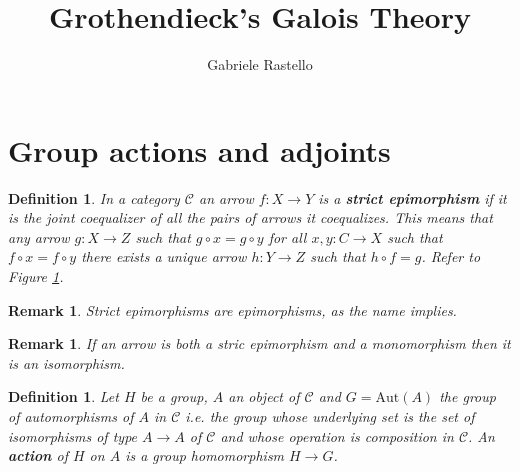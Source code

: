 \documentclass[italian, 12pt, reqno]{article}
\theoremstyle{myteo}
\newtheorem{definition}[theorem]{Definition}
\newtheorem{remark}[theorem]{Remark}
\numberwithin{equation}{section}
\newcommand{\cat}[1]{\mathscr{#1}}
\newcommand{\aut}{\text{Aut}}
\newcommand{\fun}[3]{#1\colon#2\to #3}
\begin{document}
\title{Grothendieck's Galois Theory}
\author{Gabriele Rastello}
\maketitle

\section{Group actions and adjoints}
\label{sec:1}

\begin{definition}
  \label{def:strit_epi}
  In a category \(\cat{C}\) an arrow \(\fun{f}{X}{Y}\) is a \textbf{strict epimorphism} if it is the joint coequalizer of all the pairs of arrows it coequalizes.
  This means that any arrow \(\fun{g}{X}{Z}\) such that \(g\circ x = g\circ y\) for all \(\fun{x,y}{C}{X}\) such that \(f\circ x = f\circ y\) there exists a unique arrow \(\fun{h}{Y}{Z}\) such that \(h\circ f = g\).
  Refer to Figure \ref{diagram:strict_epi}.
\end{definition}

\begin{figure}[h]
  \begin{center}
  \end{center}
  \caption{}
  \label{diagram:strict_epi}
\end{figure}

\begin{remark}
  \label{rem:strict_epi}
  Strict epimorphisms are epimorphisms, as the name implies.
\end{remark}

\begin{remark}
  \label{rem:strict_epi_plus_mono}
  If an arrow is both a stric epimorphism and a monomorphism then it is an isomorphism.
\end{remark}

\begin{definition}
  \label{def:action}
  Let \(H\) be a group, \(A\) an object of \(\cat{C}\) and \(G = \aut(A)\) the group of automorphisms of \(A\) in \(\cat{C}\) i.e. the group whose underlying set is the set of isomorphisms of type \(A\to A\) of \(\cat{C}\) and whose operation is composition in \(\cat{C}\).
  An \textbf{action} of \(H\) on \(A\) is a group homomorphism \(H \to G\).
\end{definition}
\end{document}
